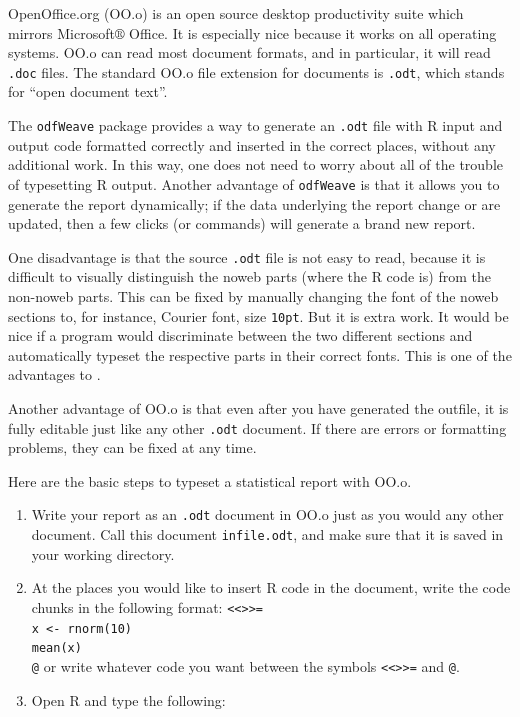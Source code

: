 \documentclass[captions=tableheading]{scrbook}
\begin{document}
OpenOffice.org (OO.o) is an open source desktop productivity suite which mirrors Microsoft$\circledR$ Office. It is especially nice because it works on all operating systems. OO.o can read most document formats, and in particular, it will read \texttt{.doc} files. The standard OO.o file extension for documents is \texttt{.odt}, which stands for ``open document text''.

The \texttt{odfWeave}  package \cite{odfweave} provides a way to generate an \texttt{.odt} file with \textsf{R} input and output code formatted correctly and inserted in the correct places, without any additional work. In this way, one does not need to worry about all of the trouble of typesetting \textsf{R} output. Another advantage of \texttt{odfWeave} is that it allows you to generate the report dynamically; if the data underlying the report change or are updated, then a few clicks (or commands) will generate a brand new report.

One disadvantage is that the source \texttt{.odt}  file is not easy to read, because it is difficult to visually distinguish the noweb parts (where the \textsf{R} code is) from the non-noweb parts. This can be fixed by manually changing the font of the noweb sections to, for instance, Courier font, size \texttt{10pt}. But it is extra work. It would be nice if a program would discriminate between the two different sections and automatically typeset the respective parts in their correct fonts. This is one of the advantages to \LyX{}.

Another advantage of OO.o is that even after you have generated the outfile, it is fully editable just like any other \texttt{.odt} document. If there are errors or formatting problems, they can be fixed at any time.

Here are the basic steps to typeset a statistical report with OO.o.

\begin{enumerate}
\item Write your report as an \texttt{.odt} document in OO.o just as you would any other document. Call this document \texttt{infile.odt}, and make sure that it is saved in your working directory.
\item At the places you would like to insert \textsf{R} code in the document, write the code chunks in the following format:
   \texttt{<\textcompwordmark{}<>\textcompwordmark{}>=}~\\
   \texttt{x <- rnorm(10)}~\\
   \texttt{mean(x)}~\\
   \texttt{@}
   or write whatever code you want between the symbols \texttt{<\textcompwordmark{}<>\textcompwordmark{}>=} and \texttt{@}.
\item Open \textsf{R} and type the following:
\end{enumerate}
\end{document}
